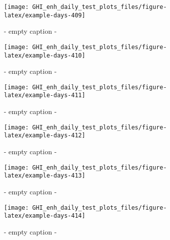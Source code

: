 \documentclass[
  10pt,
  a4paper,oneside]{article}
\begin{document}
\begin{figure}[H]

{\centering \texttt{[image: GHI\_enh\_daily\_test\_plots\_files/figure-latex/example-days-409]} 

}

\caption{ - empty caption - }\label{fig:example-days-409}
\end{figure}

\begin{figure}[H]

{\centering \texttt{[image: GHI\_enh\_daily\_test\_plots\_files/figure-latex/example-days-410]} 

}

\caption{ - empty caption - }\label{fig:example-days-410}
\end{figure}

\begin{figure}[H]

{\centering \texttt{[image: GHI\_enh\_daily\_test\_plots\_files/figure-latex/example-days-411]} 

}

\caption{ - empty caption - }\label{fig:example-days-411}
\end{figure}

\begin{figure}[H]

{\centering \texttt{[image: GHI\_enh\_daily\_test\_plots\_files/figure-latex/example-days-412]} 

}

\caption{ - empty caption - }\label{fig:example-days-412}
\end{figure}

\begin{figure}[H]

{\centering \texttt{[image: GHI\_enh\_daily\_test\_plots\_files/figure-latex/example-days-413]} 

}

\caption{ - empty caption - }\label{fig:example-days-413}
\end{figure}

\begin{figure}[H]

{\centering \texttt{[image: GHI\_enh\_daily\_test\_plots\_files/figure-latex/example-days-414]} 

}

\caption{ - empty caption - }\label{fig:example-days-414}
\end{figure}
\end{document}
